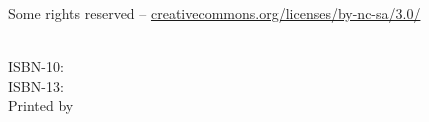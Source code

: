 %

\frontmatter
\pagestyle{titlestyle}
\hypersetup{pageanchor=false}
\setlrmarginsandblock{2cm}{2cm}{*}
\setulmarginsandblock{2cm}{2cm}{*}
\checkandfixthelayout
\makeatletter
\ch@ngetext
\makeatletter
\clearpage



%


\vspace*{\fill}
\begin{center}
{
  {\Huge \thesistitle }\\[0.5cm]
  {\huge ~\thesissubtitle~ }\\
}
\end{center}
\vspace*{\fill}
\vspace*{\fill}
\clearpage

\vspace*{\fill}
\ccbyncsa\ \thesisyear\ \thesisauthor\\
Some rights reserved -- \url{creativecommons.org/licenses/by-nc-sa/3.0/}\\

\ifdefined\thesisonline
\thesisonline~\\
\fi

\ifdefined\thesisisbna
\textsc{ISBN-10}: \href{http://www.google.com/?q=\thesisisbna}{\thesisisbna}\\
\fi
\textsc{ISBN-13}: \href{http://www.google.com/?q=\thesisisbnb}{\thesisisbnb}\\

\ifdefined\thesisprinter
Printed by \thesisprinter
\fi

